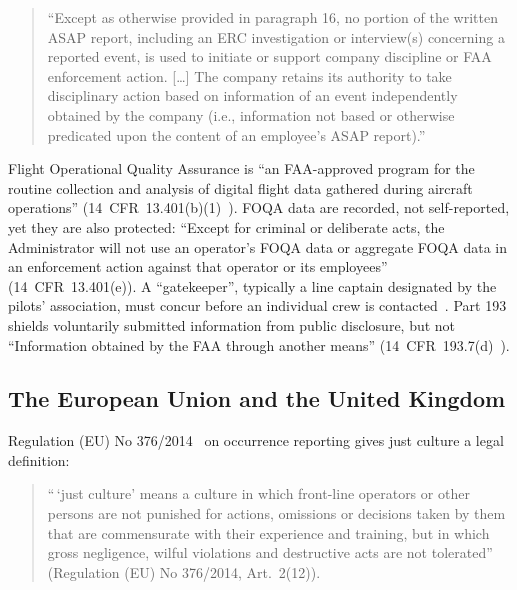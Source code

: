 \documentclass[review,12pt]{elsarticle}
\makeatletter
\renewcommand\paragraph{\@startsection{paragraph}{4}{\z@}{1.5ex \@plus .5ex \@minus .2ex}{-1em}{\normalfont\normalsize\bfseries}}
\makeatother
\begin{document}
\begin{quote}
``Except as otherwise provided in paragraph 16, no portion of the written ASAP report, including an ERC investigation or interview(s) concerning a reported event, is used to initiate or support company discipline or FAA enforcement action. {[}\ldots{]} The company retains its authority to take disciplinary action based on information of an event independently obtained by the company (i.e., information not based or otherwise predicated upon the content of an employee's ASAP report).'' \cite[para.~16.4, Note]{faa2020}
\end{quote}

\paragraph{FOQA.} Flight Operational Quality Assurance is ``an FAA-approved program for the routine collection and analysis of digital flight data gathered during aircraft operations'' (14~CFR~13.401(b)(1)~\cite{cfr13401}). FOQA data are recorded, not self-reported, yet they are also protected: ``Except for criminal or deliberate acts, the Administrator will not use an operator's FOQA data or aggregate FOQA data in an enforcement action against that operator or its employees'' (14~CFR~13.401(e)). A ``gatekeeper'', typically a line captain designated by the pilots' association, must concur before an individual crew is contacted~\cite[para.~6.b(5)]{faa2004}. Part 193 shields voluntarily submitted information from public disclosure, but not ``Information obtained by the FAA through another means'' (14~CFR~193.7(d)~\cite{cfr1937}).

\subsection{The European Union and the United Kingdom}\label{sec:eu}

Regulation (EU) No 376/2014~\cite{eu376} on occurrence reporting gives just culture a legal definition:

\begin{quote}
``\,`just culture' means a culture in which front-line operators or other persons are not punished for actions, omissions or decisions taken by them that are commensurate with their experience and training, but in which gross negligence, wilful violations and destructive acts are not tolerated'' (Regulation (EU) No 376/2014, Art.~2(12)).
\end{quote}
\end{document}
